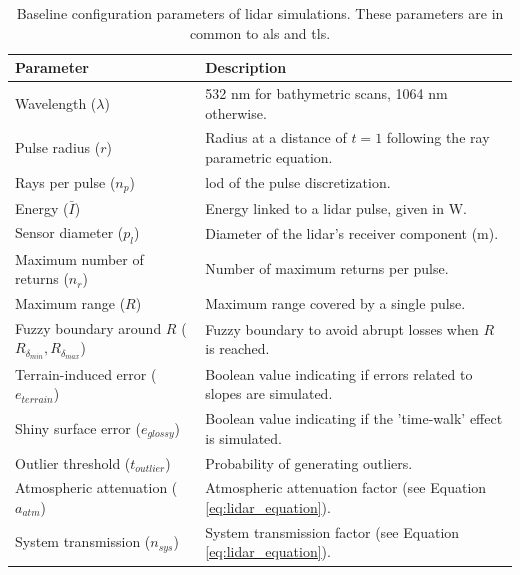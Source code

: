\renewcommand{\arraystretch}{1.2}
\begin{table}
    \small
    \caption{Baseline configuration parameters of \acrshort{lidar} simulations. These parameters are in common to \acrshort{als} and \acrshort{tls}. }
    \label{table:lidar_workflow_parameters}
    \begin{tabular}{ll}
    \toprule
    \textbf{Parameter} & \textbf{Description}\\
    \midrule
    Wavelength ($\lambda$) & 532 \si{\nano\meter} for bathymetric scans, 1064 \si{\nano\meter} otherwise.\\
    Pulse radius ($r$) & Radius at a distance of $t = 1$ following the ray parametric equation. \\
    Rays per pulse ($n_{p}$) & \acrshort{lod} of the pulse discretization. \\
    Energy ($\bar{I}$) & Energy linked to a \acrshort{lidar} pulse, given in \si{\watt}. \\
    Sensor diameter ($p_{l}$) & Diameter of the \acrshort{lidar}'s receiver component (\si{\meter}). \\
    Maximum number of returns ($n_{r}$) & Number of maximum returns per pulse. \\
    Maximum range ($R$) & Maximum range covered by a single pulse.\\
    Fuzzy boundary around $R$ ($R_{\delta_{\textit{min}}}, R_{\delta_{\textit{max}}}$) & Fuzzy boundary to avoid abrupt losses when $R$ is reached.\\
    Terrain-induced error ($e_{\textit{terrain}}$) & Boolean value indicating if errors related to slopes are simulated. \\
    Shiny surface error ($e_{\textit{glossy}}$) & Boolean value indicating if the 'time-walk' effect is simulated. \\
    Outlier threshold ($t_{\textit{outlier}}$) & Probability of generating outliers. \\
    Atmospheric attenuation ($a_{\textit{atm}}$) & Atmospheric attenuation factor (see Equation \ref{eq:lidar_equation}). \\
    System transmission ($n_{\textit{sys}}$) & System transmission factor (see Equation \ref{eq:lidar_equation}). \\
    \bottomrule
    \end{tabular}
    \libertineNormal
\end{table}
\renewcommand{\arraystretch}{1}


